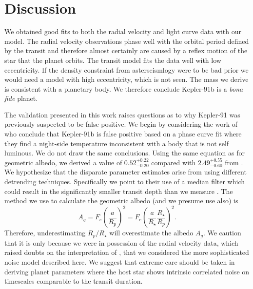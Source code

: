 \documentclass[apjl]{emulateapj}
\begin{document}
\section{Discussion}
We obtained good fits to both the radial velocity and light curve data with our model. The radial velocity observations phase well with the orbital period defined by the transit and therefore almost certainly are caused by a reflex motion of the star that the planet orbits. The transit model fits the data well with low eccentricity. If the density constraint from asterseismlogy were to be bad prior we would need a model with high eccentricity, which is not seen. The mass we derive is consistent with a planetary body. We therefore conclude Kepler-91b is a \emph{bona fide} planet.

The validation presented in this work raises questions as to why Kepler-91 was previously suspected to be false-positive. We begin by considering the work of \citet{esteves13} who conclude that Kepler-91b is false positive based on a phase curve fit where they find a night-side temperature inconsistent with a body that is not self luminous. We do not draw the same conclusions. Using the same equation as \citeauthor{esteves13} for geometric albedo, we derived a value of $0.52^{+0.22}_{-0.20}$ compared with $2.49^{+0.55}_{-0.60}$ from \citeauthor{esteves13}. We hypothesize that the disparate parameter estimates arise from using different detrending techniques. Specifically we point to their use of a median filter which could result in the significantly smaller transit depth than we measure \citep{alapini09}. The method we use to calculate the geometric albedo (and we presume \citeauthor{esteves13} use also) is
\begin{equation}
A_g = F_e \left(\frac{a}{R_p}\right)^{2} = F_e \left(\frac{a}{R_{\star}}\frac{R_{\star}}{R_{p}}\right)^{2} .
\end{equation}
Therefore, underestimating $R_{p}/R_{\star}$ will overestimate the albedo $A_g$. We caution that it is only because we were in possession of the radial velocity data, which raised doubts on the interpretation of \citeauthor{esteves13}, that we considered the more sophisticated noise model described here. We suggest that extreme care should be taken in deriving planet parameters where the host star shows intrinsic correlated noise on timescales comparable to the transit duration.
\end{document}
